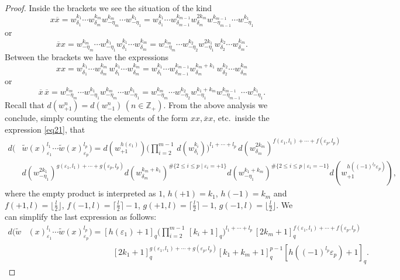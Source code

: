\documentclass[10pt,a4paper]{amsart}
\newcommand{\ZZ}{\mathbb{Z}}
\newcommand{\eps}{\varepsilon}
\newcommand{\ov}{\overline}
\begin{document}
\begin{proof}
Inside the brackets we see the situation of the kind
\[
x \ov{x}=
w^{k_1}_{\delta_1}\cdots w^{k_m}_{\delta_m}
w^{k_m}_{-\eta_m} \cdots
w^{k_1}_{-\eta_1}=
w^{k_1}_{\delta_1}\cdots w^{k_{m-1}}_{\delta_{m-1}} w^{2 k_m}_{\delta_m}
w^{k_{m-1}}_{-\eta_{m-1}} \cdots
w^{k_1}_{-\eta_1}
\]
or
\[
\ov{x} x =
w^{k_m}_{-\eta_m} \cdots
w^{k_1}_{-\eta_1}
w^{k_1}_{\delta_1}\cdots w^{k_m}_{\delta_m}=
w^{k_m}_{-\eta_m} \cdots
w^{k_2}_{-\eta_2}
w^{2 k_1}_{-\eta_1}
w^{k_2}_{\delta_2}\cdots w^{k_m}_{\delta_m}.
\]
 Between the brackets we have the expressions
\[
xx=w^{k_1}_{\delta_1}\cdots w^{k_m}_{\delta_m}\,
w^{k_1}_{\delta_1}\cdots w^{k_m}_{\delta_m}=
w^{k_1}_{\delta_1}\cdots w^{k_{m-1}}_{\delta_{m-1}}w^{ k_m+k_1}_{\delta_m}\,
w^{k_2}_{\delta_2} \cdots w^{k_m}_{\delta_m}
\]
or 
\[
\ov{x}\, \ov{x} = 
w^{k_m}_{-\eta_m} \cdots
w^{k_1}_{-\eta_1}
w^{k_m}_{-\eta_m} \cdots
w^{k_1}_{-\eta_1}=
w^{k_m}_{-\eta_m} \cdots w^{k_2}_{-\eta_2}
w^{k_1+k_m }_{-\eta_1}
w^{k_{m-1}}_{-\eta_{m-1}} \cdots 
w^{k_1}_{-\eta_1}.
\]
Recall that $d(w^n_{+1})=d(w^n_{-1})\,(n\in\ZZ_+)$. From the above analysis  we conclude, simply counting the elements of the form $xx,  \ov{x} x$, etc.\ inside the expression \eqref{eq21}, that 
\begin{align*}
d( 
&\widetilde{w}(x)^{l_1}_{\eps_1}\cdots
\widetilde{w}(x)^{l_p}_{\eps_p})=
d(w^{h(\eps_1)}_{+1}) \bigl( \prod_{i=2}^{m-1}\, d(w^{k_i}_{\delta_i})\bigr)^{l_1+\cdots + l_p}\,
d(w^{2k_m}_{\delta_m})^{f(\eps_1,l_1)+\cdots+
f(\eps_p,l_p)}
\\
&
d(w^{2k_1}_{-\eta_1})^{g(\eps_1,l_1)+\cdots+
	g(\eps_p,l_p)}
d(w^{k_m+k_1}_{\delta_m})^{ \#\{2 \le i\le p\mid \eps_i=+1\}}
d(w^{k_1+k_m}_{-\eta_1})^{ \#\{2 \le i \le p\mid \eps_i=-1\}}d(w^{h((-1)^{l_p}\eps_p)}_{+1}),
\end{align*}
where the empty product is interpreted as $1$, $h(+1)=k_1$, $h(-1)=k_m$ and $f(+1,l)=\lfloor \tfrac{l}{2}\rfloor$, $f(-1,l)=\lceil \tfrac{l}{2}\rceil -1$, $g(+1, l)=\lceil \tfrac{l}{2}\rceil -1$, $g(-1,l)=\lfloor \tfrac{l}{2}\rfloor$. We can simplify the last expression as follows:
\begin{align*}
d( 
\widetilde{w}&(x)^{l_1}_{\eps_1}\cdots
\widetilde{w}(x)^{l_p}_{\eps_p}) =
[h(\eps_1)+1]_q  \bigl( \prod_{i=2}^{m-1}\, [k_i+1 ]_q\bigr)^{l_1+\cdots + l_p}\,
[2k_m+1]_q^{f(\eps_1,l_1)+\cdots+
f(\eps_p,l_p)}
\\
&\quad\quad\quad\quad\quad
\quad\quad\quad\quad\;\;\;\;\;
[2k_1+1]_q^{g(\eps_1,l_1)+\cdots+
	g(\eps_p,l_p)}
[ k_1+k_m+1]_q^{p-1} [h((-1)^{l_p}\eps_p)+1]_q.
\end{align*}

\end{proof}
\end{document}
